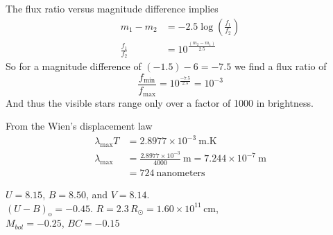 The flux ratio versus magnitude difference implies
\begin{align*}
m_1 - m_2 &= -2.5 \log\!\left(\frac{f_1}{f_2}\right)\\
\frac{f_1}{f_2} &= 10^{\frac{(m_2 - m_1)}{2.5}}
\end{align*}
So for a magnitude difference of $(-1.5) - 6 = -7.5$ we find a flux ratio of
\[
\frac{f_{\min}}{f_{\max}} = 10^{\frac{-7.5}{2.5}} = 10^{-3}
\]
And thus the visible stars range only over a factor of 1000 in brightness.

From the Wien's displacement law
\begin{align*}
\lambda_{\max} T &= 2.8977 \times 10^{-3}~\mathrm{m.K}\\
\lambda_{\max} &= \frac{2.8977 \times 10^{-3}}{4000}~\mathrm{m}
  = 7.244 \times 10^{-7}~\mathrm{m}\\
&= 724~\text{nanometers}
\end{align*}

$U = 8.15$, $B = 8.50$, and $V = 8.14$.\\
$(U-B)_{\mathrm{o}} = -0.45$. \quad
$R = 2.3\,R_\odot = 1.60 \times 10^{11}$\,cm,\\
$M_{bol} = -0.25$, $BC = -0.15$

